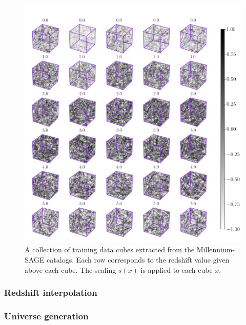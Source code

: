\documentclass[twocolumn]{article}
\numberwithin{equation}{section}
\begin{document}
\begin{figure}[hbt!]
\includegraphics[width=15cm]{figures/cubes/classes3d.jpg}
\centering
\caption{A collection of training data cubes extracted from the Millennium-SAGE catalogs. Each row corresponds to the redshift value given above each cube. The scaling $s(x)$ is applied to each cube $x$.}
\label{fig:gan_game}
\end{figure}

\subsubsection{Redshift interpolation}

\subsubsection{Universe generation}
\end{document}
